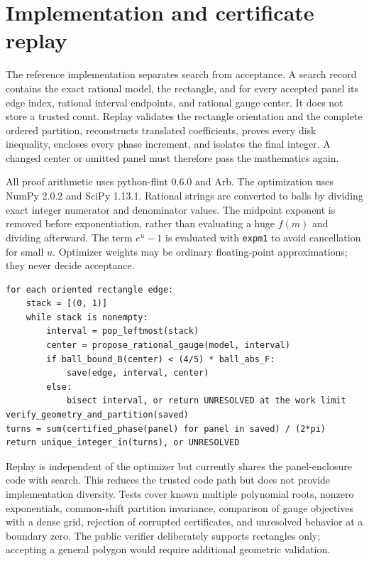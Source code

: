 \documentclass[11pt,a4paper]{article}
\begin{document}
\section{Implementation and certificate replay}
The reference implementation separates search from acceptance. A search record contains the exact rational model, the rectangle, and for every accepted panel its edge index, rational interval endpoints, and rational gauge center. It does not store a trusted count. Replay validates the rectangle orientation and the complete ordered partition, reconstructs translated coefficients, proves every disk inequality, encloses every phase increment, and isolates the final integer. A changed center or omitted panel must therefore pass the mathematics again.

All proof arithmetic uses python-flint 0.6.0 and Arb. The optimization uses NumPy 2.0.2 and SciPy 1.13.1. Rational strings are converted to balls by dividing exact integer numerator and denominator values. The midpoint exponent is removed before exponentiation, rather than evaluating a huge $f(m)$ and dividing afterward. The term $e^u-1$ is evaluated with \texttt{expm1} to avoid cancellation for small $u$. Optimizer weights may be ordinary floating-point approximations; they never decide acceptance.

\begin{lstlisting}[caption={Core search and verification contract (pseudocode).},label={alg:contract}]
for each oriented rectangle edge:
    stack = [(0, 1)]
    while stack is nonempty:
        interval = pop_leftmost(stack)
        center = propose_rational_gauge(model, interval)
        if ball_bound_B(center) < (4/5) * ball_abs_F:
            save(edge, interval, center)
        else:
            bisect interval, or return UNRESOLVED at the work limit
verify_geometry_and_partition(saved)
turns = sum(certified_phase(panel) for panel in saved) / (2*pi)
return unique_integer_in(turns), or UNRESOLVED
\end{lstlisting}

Replay is independent of the optimizer but currently shares the panel-enclosure code with search. This reduces the trusted code path but does not provide implementation diversity. Tests cover known multiple polynomial roots, nonzero exponentials, common-shift partition invariance, comparison of gauge objectives with a dense grid, rejection of corrupted certificates, and unresolved behavior at a boundary zero. The public verifier deliberately supports rectangles only; accepting a general polygon would require additional geometric validation.
\end{document}
